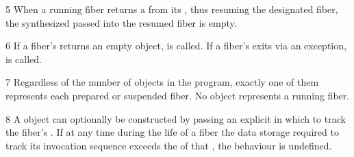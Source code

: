 

5 When a running fiber returns a \fiber from its \entryfn, thus resuming the
designated fiber, the synthesized \fiber passed into the resumed fiber is
empty.

6 If a fiber's \entryfn returns an empty \fiber object,  is called.
If a fiber's \entryfn exits via an exception,  is called.

7 Regardless of the number of \fiber objects in the program, exactly one of them
represents each prepared or suspended fiber. No \fiber object represents a running fiber.

8 A \fiber object can optionally be constructed by passing an explicit
 in which to track the fiber's
. If at any time during the
life of a fiber the data storage required to track its invocation sequence
exceeds the  of that , the behaviour is undefined.



